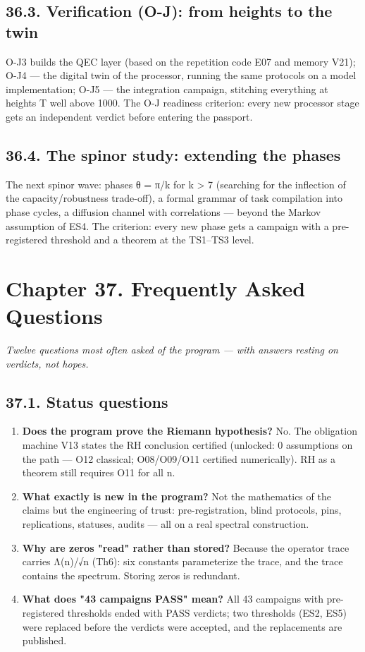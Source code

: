 \documentclass[11pt,a4paper]{article}
\begin{document}
\subsection{36.3. Verification (O-J): from heights to the twin}

O-J3 builds the QEC layer (based on the repetition code E07 and memory V21); O-J4 — the digital twin of the processor, running the same protocols on a model implementation; O-J5 — the integration campaign, stitching everything at heights T well above 1000. The O-J readiness criterion: every new processor stage gets an independent verdict before entering the passport.

\subsection{36.4. The spinor study: extending the phases}

The next spinor wave: phases θ = π/k for k > 7 (searching for the inflection of the capacity/robustness trade-off), a formal grammar of task compilation into phase cycles, a diffusion channel with correlations — beyond the Markov assumption of ES4. The criterion: every new phase gets a campaign with a pre-registered threshold and a theorem at the TS1–TS3 level.

\section{Chapter 37. Frequently Asked Questions}

\noindent\textit{\color{copper}Twelve questions most often asked of the program — with answers resting on verdicts, not hopes.}

\subsection{37.1. Status questions}

\begin{enumerate}
  \item \textbf{Does the program prove the Riemann hypothesis?} No. The obligation machine V13 states the RH conclusion certified (unlocked: 0 assumptions on the path — O12 classical; O08/O09/O11 certified numerically). RH as a theorem still requires O11 for all n.
  \item \textbf{What exactly is new in the program?} Not the mathematics of the claims but the engineering of trust: pre-registration, blind protocols, pins, replications, statuses, audits — all on a real spectral construction.
  \item \textbf{Why are zeros "read" rather than stored?} Because the operator trace carries Λ(n)/√n (Th6): six constants parameterize the trace, and the trace contains the spectrum. Storing zeros is redundant.
  \item \textbf{What does "43 campaigns PASS" mean?} All 43 campaigns with pre-registered thresholds ended with PASS verdicts; two thresholds (ES2, ES5) were replaced before the verdicts were accepted, and the replacements are published.
\end{enumerate}
\end{document}
